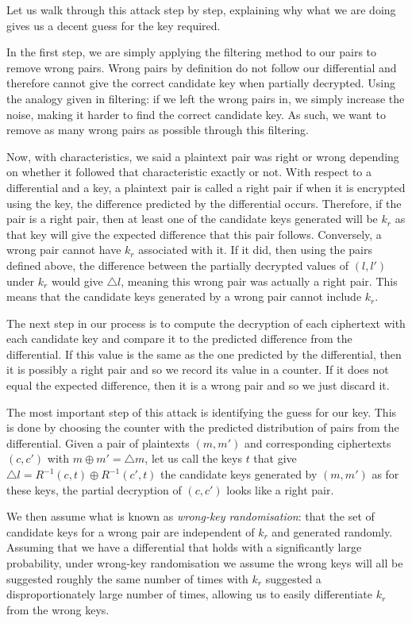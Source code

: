 \documentclass[12pt,a4paper]{article}
\begin{document}
Let us walk through this attack step by step, explaining why what we are doing
gives us a decent guess for the key required.

In the first step, we are simply applying the filtering method to our pairs to
remove wrong pairs. Wrong pairs by definition do not follow our differential
and therefore cannot give the correct candidate key when partially decrypted.
Using the analogy given in filtering: if we left the wrong pairs in, we simply
increase the noise, making it harder to find the correct candidate key. As
such, we want to remove as many wrong pairs as possible through this filtering.

Now, with characteristics, we said a plaintext
pair was right or wrong depending on whether it followed that characteristic
exactly or not. With respect to a differential and a key, a plaintext pair is
called a right pair if when it is encrypted using the key, the difference
predicted by the differential occurs.  Therefore, if the pair is a right pair,
then at least one of the candidate keys generated will be $k_r$ as that key
will give the expected difference that this pair follows. Conversely, a wrong
pair cannot have $k_r$ associated with it. If it did, then using the pairs
defined above, the difference between the partially decrypted values of
$(l,l ')$ under $k_r$ would give $\triangle l$, meaning this wrong pair was
actually a right pair. This means that the candidate keys generated by a wrong
pair cannot include $k_r$.

The next step in our process is to compute the decryption of each ciphertext
with each candidate key and compare it to the predicted difference from the
differential. If this value is the same as the one predicted by the
differential, then it is possibly a right pair and so we record its value in a
counter. If it does not equal the expected difference, then it is a wrong pair
and so we just discard it.


The most important step of this attack is identifying the guess for our key.
This is done by choosing the counter with the predicted distribution of pairs
from the differential. Given a pair of plaintexts $(m,m')$ and corresponding
ciphertexts $(c,c')$ with $m \oplus m' = \triangle m$, let us call the keys $t$
that give $\triangle l = R^{-1}(c,t) \oplus R^{-1}(c',t)$ the candidate keys
generated by $(m,m')$ as for these keys, the partial decryption of $(c,c')$
looks like a right pair.

We then assume what is known as \textit{wrong-key randomisation}: that the set
of candidate keys for a wrong pair are independent of $k_r$ and generated
randomly. Assuming that we have a differential that holds with a significantly
large probability, under wrong-key randomisation we assume the wrong keys will
all be suggested roughly the same number of times with $k_r$ suggested a
disproportionately large number of times, allowing us to easily differentiate
$k_r$ from the wrong keys.
\end{document}
